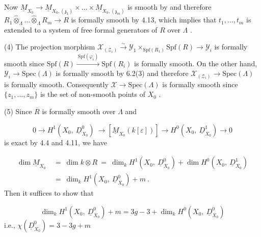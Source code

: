 Now $\underline{M}_{X_0} \to \underline{M}_{X_0,(\mathfrak{z}_1)} \times \ldots \times \underline{M}_{X_0,(\mathfrak{z}_m)}$ is smooth by and therefore $R_1 \hat{\otimes}_{\Lambda} \ldots \hat{\otimes}_{\Lambda} R_m \to R$ is formally smooth by 4.13, which implies that $t_1,\ldots,t_m$ is extended to a system of free formal generators of $R$ over $\Lambda$ .



(4)  The projection morphism  $\mathcal{X}_{(\mathcal{Z}_i)} \overset{\sim}{\rightarrow} \mathcal{Y}_1 \times_{\mathrm{Spf}(R_1)} \mathrm{Spf}(R) \rightarrow \mathcal{Y}_i$  is formally smooth since  $\mathrm{Spf}(R) \xrightarrow{\ \mathrm{Spf}(\varphi_i)\ } \mathrm{Spf}(R_i)$  is formally smooth. On the other hand, $\mathcal{Y}_i \rightarrow \mathrm{Spec}(\Lambda)$  is formally smooth by 6.2(3)  and therefore  $\mathcal{X}_{(\mathcal{Z}_i)} \rightarrow \mathrm{Spec}(\Lambda)$  is formally smooth. Consequently  $\mathcal{X} \rightarrow \mathrm{Spec}(\Lambda)$  is formally smooth since  $\{z_1,\dots,z_m\}$  is the set of non-smooth points of  $X_0$ .

(5)  Since  $\overline{R}$  is formally smooth over  $\Lambda$  and

\begin{equation*}
0 \rightarrow H^1(X_0,\ \underline{D}^0_{X_0})\ \rightarrow [\underline{M}_{X_0}(k[\varepsilon])] \rightarrow H^0(X_0,\ \underline{D}^1_{X_0}) \rightarrow 0
\end{equation*}
is exact by 4.4 and 4.11, we have

\begin{equation*}
\begin{aligned}
\dim \underline{M}_{X_0} \ &= \ \dim k \otimes R \ = \ \dim_k H^1(X_0,\ \underline{D}^0_{X_0}) + \dim H^0(X_0,\ \underline{D}^1_{X_0})\\
&= \ \dim_k H^1(X_0,\ \underline{D}^0_{X_0}) + m \ .
\end{aligned}
\end{equation*}
Then it suffices to show that

\begin{equation*}
\dim_k H^1(X_0,\ \underline{D}^0_{X_0}) + m = 3g - 3 + \dim_k H^0(X_0,\ \underline{D}^0_{X_0})
\end{equation*}
i.e.,  $\chi(\underline{D}^0_{X_0}) = 3 - 3g + m$


